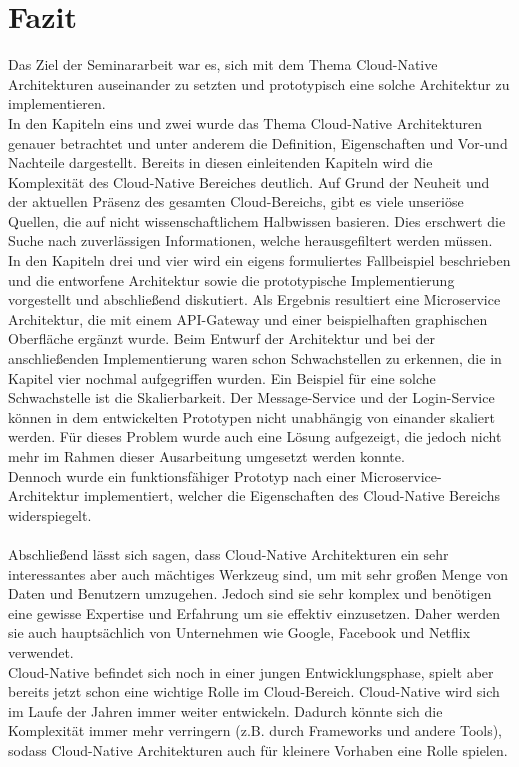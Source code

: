 \chapter{Fazit}
Das Ziel der Seminararbeit war es, sich mit dem Thema Cloud-Native Architekturen auseinander zu setzten und prototypisch eine solche Architektur zu implementieren.\\
In den Kapiteln eins und zwei wurde das Thema Cloud-Native Architekturen genauer betrachtet und unter anderem die Definition, Eigenschaften und Vor-und Nachteile dargestellt. Bereits in diesen einleitenden Kapiteln wird die Komplexität des Cloud-Native Bereiches deutlich. Auf Grund der Neuheit und der aktuellen Präsenz des gesamten Cloud-Bereichs, gibt es viele unseriöse Quellen, die auf nicht wissenschaftlichem Halbwissen basieren. Dies erschwert die Suche nach zuverlässigen Informationen, welche herausgefiltert werden müssen.\\
In den Kapiteln drei und vier wird ein eigens formuliertes Fallbeispiel beschrieben und die entworfene Architektur sowie die prototypische Implementierung vorgestellt und abschließend diskutiert. Als Ergebnis resultiert eine Microservice Architektur, die mit einem API-Gateway und einer beispielhaften graphischen Oberfläche ergänzt wurde. Beim Entwurf der Architektur und bei der anschließenden Implementierung waren schon Schwachstellen zu erkennen, die in Kapitel vier nochmal aufgegriffen wurden. Ein Beispiel für eine solche Schwachstelle ist die Skalierbarkeit. Der Message-Service und der Login-Service können in dem entwickelten Prototypen nicht unabhängig von einander skaliert werden. Für dieses Problem wurde auch eine Lösung aufgezeigt, die jedoch nicht mehr im Rahmen dieser Ausarbeitung umgesetzt werden konnte.\\
Dennoch wurde ein funktionsfähiger Prototyp nach einer Microservice-Architektur implementiert, welcher die Eigenschaften des Cloud-Native Bereichs widerspiegelt.\\
\\
Abschließend lässt sich sagen, dass Cloud-Native Architekturen ein sehr interessantes aber auch mächtiges Werkzeug sind, um mit sehr großen Menge von Daten und Benutzern umzugehen. Jedoch sind sie sehr komplex und benötigen eine gewisse Expertise und Erfahrung um sie effektiv einzusetzen. Daher werden sie auch hauptsächlich von Unternehmen wie Google, Facebook und Netflix verwendet.\\
Cloud-Native befindet sich noch in einer jungen Entwicklungsphase, spielt aber bereits jetzt schon eine wichtige Rolle im Cloud-Bereich. Cloud-Native wird sich im Laufe der Jahren immer weiter entwickeln. Dadurch könnte sich die Komplexität immer mehr verringern (z.B. durch Frameworks und andere Tools), sodass Cloud-Native Architekturen auch für kleinere Vorhaben eine Rolle spielen.
